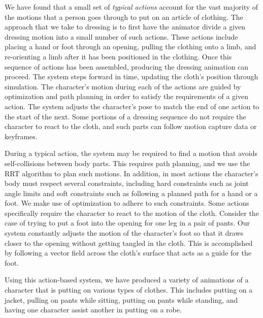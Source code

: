 We have found that a small set of \emph{typical actions} account for the vast
majority of the motions that a person goes through to put on an article of
clothing.  The approach that we take to dressing is to first have the
animator divide a given dressing motion into a small number of such
actions.  These actions include placing a hand or foot through an opening,
pulling the clothing onto a limb, and re-orienting a limb after it has
been positioned in the clothing.  Once this sequence of actions has been
assembled, producing the dressing animation can proceed.  The system steps
forward in time, updating the cloth's position through simulation.  The
character's motion during each of the actions are guided by optimization
and path planning in order to satisfy the requirements of a given
action.  The system adjusts the character's pose to match the end of one
action to the start of the next.  Some portions of a dressing sequence do
not require the character to react to the cloth, and such parts can follow
motion capture data or keyframes.

During a typical action, the system may be required to find a motion that
avoids self-collisions between body parts.  This requires path planning,
and we use the RRT algorithm to plan such motions.  In addition, in most
actions the character's body must respect several constraints, including
hard constraints such as joint angle limits and soft constraints such as
following a planned path for a hand or a foot.  We make use of
optimization to adhere to such constraints.  Some actions specifically
require the character to react to the motion of the cloth.  Consider the
case of trying to put a foot into the opening for one leg in a pair of
pants.  Our system constantly adjusts the motion of the character's foot
so that it draws closer to the opening without getting tangled in the
cloth.  This is accomplished by following a vector field across the
cloth's surface that acts as a guide for the foot.

Using this action-based system, we have produced a variety of animations
of a character that is putting on various types of clothes.  This includes
putting on a jacket, pulling on pants while sitting, putting on pants
while standing, and having one character assist another in putting on a
robe.


